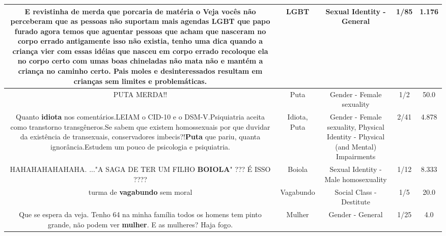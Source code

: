 \documentclass[11pt]{article}
\newlength\mylength
\begin{document}
\begin{center}
\begin{longtable}{|C{.65\mylength}|C{.30\mylength}|C{.12\mylength}|C{.12\mylength}|C{.12\mylength}|}
  \small E revistinha de merda que porcaria de matéria o Veja vocês não perceberam que as pessoas não suportam mais agendas \textbf{LGBT} que papo furado agora temos que aguentar pessoas que acham que nasceram no corpo errado antigamente isso não existia, tenho uma dica quando a criança vier com essas idéias que nasceu em corpo errado recoloque ela no corpo certo com umas boas chineladas não mata não e mantém a criança no caminho certo. Pais moles e desinteressados resultam em crianças sem limites e problemáticas.\normalsize   & LGBT & Sexual Identity - General & 1/85 & 1.176 \\  \hline
  \small PUTA MERDA!!\normalsize   & Puta & Gender - Female sexuality & 1/2 & 50.0 \\  \hline
  \small Quanto \textbf{idiota} nos comentários.LEIAM o CID-10 e o DSM-V.Psiquiatria aceita como transtorno transgêneros.Se sabem que existem homossexuais por que duvidar da existência de transexuais, conservadores imbecis?!\textbf{Puta} que pariu, quanta ignorância.Estudem um pouco de psicologia e psiquiatria.\normalsize   & Idiota, Puta & Gender - Female sexuality, Physical Identity - Physical (and Mental) Impairments & 2/41 & 4.878 \\  \hline
  \small HAHAHAHAHAHAHA. ..."A SAGA DE TER UM FILHO \textbf{BOIOLA}" ???  É ISSO ????\normalsize   & Boiola & Sexual Identity - Male homosexuality & 1/12 & 8.333 \\  \hline
  \small turma de \textbf{vagabundo} sem moral\normalsize   & Vagabundo & Social Class - Destitute & 1/5 & 20.0 \\  \hline
  \small Que se espera da veja. Tenho 64 na minha família todos os homens tem pinto grande, não podem ver \textbf{mulher}. E as mulheres? Haja fogo.\normalsize   & Mulher & Gender - General & 1/25 & 4.0 \\  \hline
  
\end{longtable}
\end{center}
\end{document}

